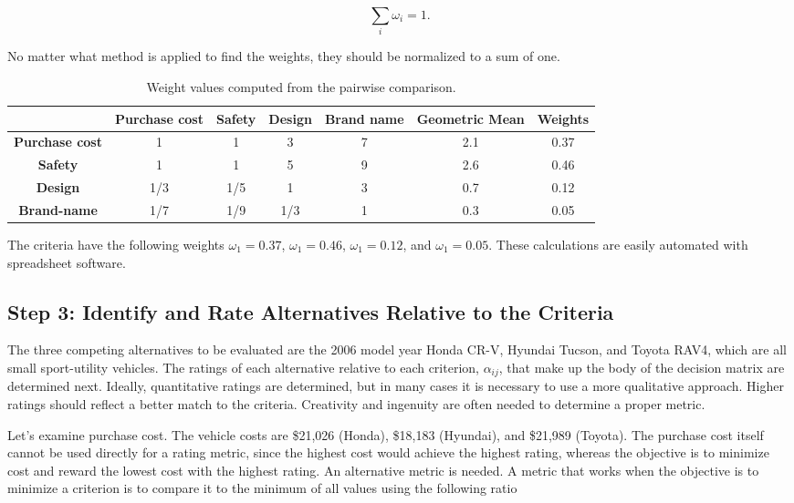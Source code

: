 $$\sum_{i} \omega_{i} = 1.$$

No matter what
method is applied to find the weights, they should be normalized to a
sum of one.

\begin{table}[h]
\caption{Weight values computed from the pairwise comparison.}
\label{table:weightedValuesFromPairwiseCompareSelection}

\begin{tabular}{|c|c|c|c|c|c|c|}
\hline
\rowcolor{Gray}
			 & \textbf{Purchase cost}  & \textbf{Safety} & \textbf{Design} & \textbf{Brand name} & {Geometric Mean} & {Weights}\\ \hline
\textbf{Purchase cost} & 1 & 1 & 3 & 7 & 2.1 & 0.37 \\ \hline
\textbf{Safety} & 1 & 1 & 5 & 9 & 2.6 & 0.46 \\ \hline
\textbf{Design} & 1/3 & 1/5 & 1 & 3 & 0.7 & 0.12 \\ \hline
\textbf{Brand-name} & 1/7 & 1/9 & 1/3 & 1 & 0.3 & 0.05 \\ \hline
\end{tabular}
\end{table}


The criteria have the following weights
$\omega_{1} =0.37$,
$\omega_{1} =0.46$,
$\omega_{1} =0.12$, and
$\omega_{1} =0.05$. These calculations are
easily automated with spreadsheet software.

\subsection*{Step 3: Identify and Rate Alternatives Relative to the Criteria}


The three competing alternatives to be evaluated are the 2006 model year
Honda CR-V, Hyundai Tucson, and Toyota RAV4, which are all small
sport-utility vehicles. The ratings of each alternative relative to each
criterion, $\alpha_{ij}$, that make up the body
of the decision matrix are determined next. Ideally, quantitative
ratings are determined, but in many cases it is necessary to use a more
qualitative approach. Higher ratings should reflect a better match to
the criteria. Creativity and ingenuity are often needed to determine a
proper metric.

Let's examine purchase cost. The vehicle costs are \$21,026 (Honda),
\$18,183 (Hyundai), and \$21,989 (Toyota). The purchase cost itself
cannot be used directly for a rating metric, since the highest cost
would achieve the highest rating, whereas the objective is to minimize
cost and reward the lowest cost with the highest rating. An alternative
metric is needed. A metric that works when the objective is to minimize
a criterion is to compare it to the minimum of all values using the
following ratio

